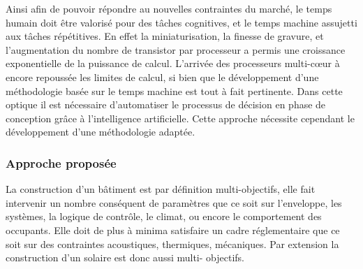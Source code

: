 Ainsi afin de pouvoir répondre au nouvelles contraintes du marché, le temps humain doit
être valorisé pour des tâches cognitives, et le temps machine assujetti aux tâches
répétitives. En effet la miniaturisation, la finesse de gravure, et l’augmentation du
nombre de transistor par processeur a permis une croissance exponentielle de la puissance
de calcul. L’arrivée des processeurs multi-cœur à encore repoussée les limites de calcul,
si bien que le développement d’une méthodologie basée sur le temps machine est tout à fait
pertinente. Dans cette optique il est nécessaire d’automatiser le processus de décision en
phase de conception grâce à l’intelligence artificielle. Cette approche nécessite cependant
le développement d’une méthodologie adaptée.


\subsubsection{Approche proposée} %
\label{ssub:approche_proposee}
La construction d’un bâtiment est par définition multi-objectifs, elle fait intervenir un
nombre conséquent de paramètres que ce soit sur l’enveloppe, les systèmes, la logique de
contrôle, le climat, ou encore le comportement des occupants. Elle doit de plus à minima
satisfaire un cadre réglementaire que ce soit sur des contraintes acoustiques, thermiques,
mécaniques. Par extension la construction d’un  solaire est donc aussi multi-
objectifs.

